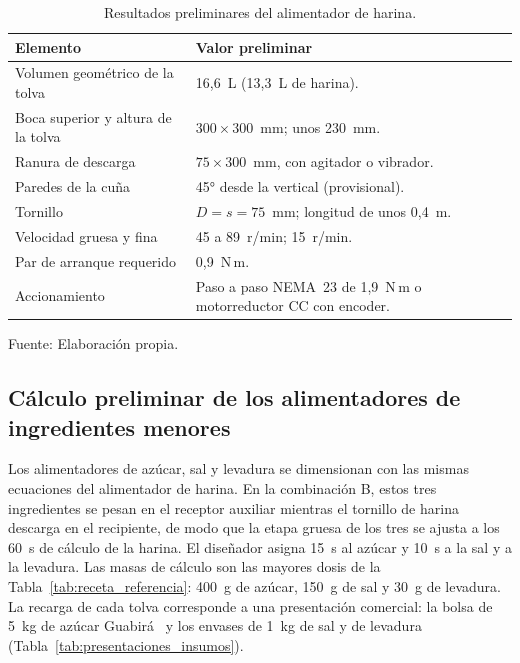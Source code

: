 \begin{table}[H]
    \centering
    \caption{Resultados preliminares del alimentador de harina.}
    \label{tab:resultados_alimentador}
    \footnotesize
    \renewcommand{\arraystretch}{1.15}
    \begin{tabularx}{\textwidth}{>{\raggedright\arraybackslash}p{}X}
        \toprule
        \textbf{Elemento} & \textbf{Valor preliminar} \\
        \midrule
        Volumen geométrico de la tolva & 16,6~L (13,3~L de harina). \\
        Boca superior y altura de la tolva & $300 \times 300$~mm; unos 230~mm. \\
        Ranura de descarga & $75 \times 300$~mm, con agitador o vibrador. \\
        Paredes de la cuña & 45° desde la vertical (provisional). \\
        Tornillo & $D = s = 75$~mm; longitud de unos 0,4~m. \\
        Velocidad gruesa y fina & 45 a 89~r/min; 15~r/min. \\
        Par de arranque requerido & 0,9~N\,m. \\
        Accionamiento & Paso a paso NEMA~23 de 1,9~N\,m o motorreductor CC con encoder. \\
        \bottomrule
    \end{tabularx}
    \par\smallskip
    Fuente: Elaboración propia.
\end{table}

\subsection{Cálculo preliminar de los alimentadores de ingredientes menores}
\label{subsec:calculo_alimentadores_menores}

Los alimentadores de azúcar, sal y levadura se dimensionan con las mismas
ecuaciones del alimentador de harina. En la combinación B, estos tres
ingredientes se pesan en el receptor auxiliar mientras el tornillo de
harina descarga en el recipiente, de modo que la etapa gruesa de los
tres se ajusta a los 60~s de cálculo de la harina. El diseñador asigna 15~s al azúcar y
10~s a la sal y a la levadura. Las masas de cálculo son las mayores dosis
de la Tabla~\ref{tab:receta_referencia}: 400~g de azúcar, 150~g de sal y
30~g de levadura. La recarga de cada tolva corresponde a una presentación
comercial: la bolsa de 5~kg de azúcar Guabirá~\parencite{guabira2026extrafina}
y los envases de 1~kg de sal y de levadura
(Tabla~\ref{tab:presentaciones_insumos}).

